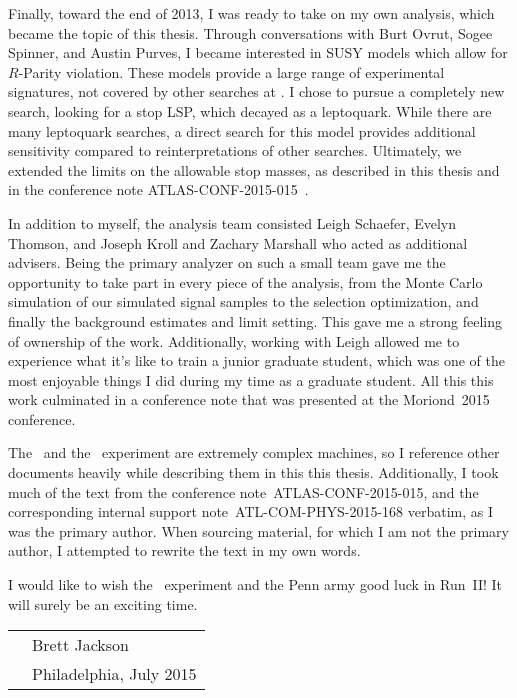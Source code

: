 Finally, toward the end of 2013, I was ready to take on my own analysis, which
became the topic of this thesis.
Through conversations with Burt Ovrut, Sogee Spinner, and Austin Purves, I
became interested in SUSY models which allow for $R$-Parity violation.
These models provide a large range of experimental signatures, not covered by
other searches at \atlas.
I chose to pursue a completely new search, looking for a stop LSP, which
decayed as a leptoquark.
While there are many leptoquark searches, a direct search for this model 
provides additional sensitivity compared to reinterpretations of other searches.
Ultimately, we extended the limits on the allowable stop masses, as described
in this thesis and in the conference note
ATLAS-CONF-2015-015~\cite{ATLAS-CONF-2015-015}.

In addition to myself, the analysis team consisted Leigh Schaefer, Evelyn
Thomson, and Joseph Kroll and Zachary Marshall who acted as additional advisers.
Being the primary analyzer on such a small team gave me the opportunity to take
part in every piece of the analysis, from the Monte Carlo simulation of our
simulated signal samples to the selection optimization, and finally the
background estimates and limit setting.
This gave me a strong feeling of ownership of the work.
Additionally, working with Leigh allowed me to experience what it's like to
train a junior graduate student, which was one of the most enjoyable things
I did during my time as a graduate student.
All this this work culminated in a conference note that was presented at the
Moriond~2015 conference.

The \lhc\ and the \atlas\ experiment are extremely complex machines, so I
reference other documents heavily while describing them in this this thesis.
Additionally, I took much of the text from the conference
note~{ATLAS-CONF-2015-015}, and the corresponding internal support
note~{ATL-COM-PHYS-2015-168} verbatim, as I was the primary author.
When sourcing material, for which I am not the primary author, I attempted to
rewrite the text in my own words.

I would like to wish the \atlas\ experiment and the Penn army good luck in
Run~II!
It will surely be an exciting time.

\vspace{0.05\textheight}

\begin{tabular}{p{} l}
  & Brett Jackson         \\
  & Philadelphia, July 2015   \\
\end{tabular}

